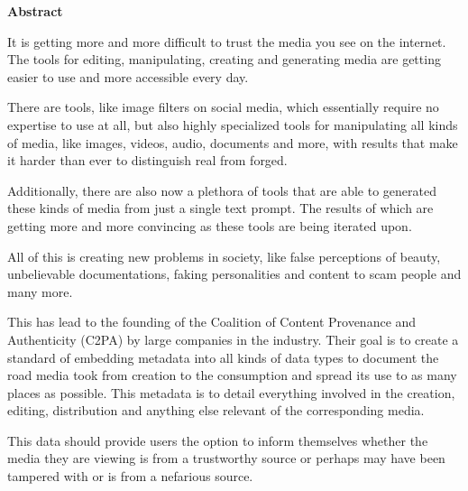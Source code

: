 \thispagestyle{empty}
\vspace*{1.0cm}

\begin{center}
    \textbf{Abstract}
\end{center}

\vspace*{0.5cm}

\noindent

It is getting more and more difficult to trust the media you see on the internet. The tools for editing, manipulating, creating and generating media are getting easier to use and more accessible every day.

There are tools, like image filters on social media, which essentially require no expertise to use at all, but also highly specialized tools for manipulating all kinds of media, like images, videos, audio, documents and more, with results that make it harder than ever to distinguish real from forged.

Additionally, there are also now a plethora of tools that are able to generated these kinds of media from just a single text prompt. The results of which are getting more and more convincing as these tools are being iterated upon.

All of this is creating new problems in society, like false perceptions of beauty, unbelievable documentations, faking personalities and content to scam people and many more.

This has lead to the founding of the Coalition of Content Provenance and Authenticity (C2PA) by large companies in the industry. Their goal is to create a standard of embedding metadata into all kinds of data types to document the road media took from creation to the consumption and spread its use to as many places as possible. This metadata is to detail everything involved in the creation, editing, distribution and anything else relevant of the corresponding media.

This data should provide users the option to inform themselves whether the media they are viewing is from a trustworthy source or perhaps may have been tampered with or is from a nefarious source.
